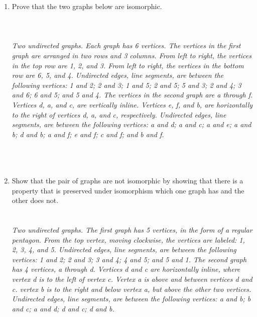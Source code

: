 \documentclass{amsart}
\theoremstyle{definition}
\theoremstyle{Exercise}
\theoremstyle{remark}
\theoremstyle{rule}
\numberwithin{equation}{section}
\begin{document}
\begin{enumerate}[label=(\alph*)]
\item Prove that the two graphs below are isomorphic.\\\\
   \\\\
 {\color{blue}{\bf Figure 4:} \emph{Two undirected graphs. Each graph has 6 vertices. The vertices in the first graph are arranged in two rows and 3 columns. From left to right, the vertices in the top row are 1, 2, and 3. From left to right, the vertices in the bottom row are 6, 5, and 4. Undirected edges, line segments, are between the following vertices: 1 and 2; 2 and 3; 1 and 5; 2 and 5; 5 and 3; 2 and 4; 3 and 6; 6 and 5; and 5 and 4. The vertices in the second graph are a through f. Vertices d, a, and c, are vertically inline. Vertices e, f, and b, are horizontally to the right of vertices d, a, and c, respectively. Undirected edges, line segments, are between the following vertices: a and d; a and c; a and e; a and b; d and b; a and f; e and f; c and f; and b and f.
}
}
\\\\
\\\\
\item Show that the pair of graphs are not isomorphic by showing that there is a property that is preserved under isomorphism which one graph has and the other does not.\\

\\\\
{\color{blue}{\bf Figure 5:} \emph{Two undirected graphs. The first graph has 5 vertices, in the form of a regular pentagon. From the top vertex, moving clockwise, the vertices are labeled: 1, 2, 3, 4, and 5. Undirected edges, line segments, are between the following vertices: 1 and 2; 2 and 3; 3 and 4; 4 and 5; and 5 and 1. The second graph has 4 vertices, a through d. Vertices d and c are horizontally inline, where vertex d is to the left of vertex c. Vertex a is above and between vertices d and c. vertex b is to the right and below vertex a, but above the other two vertices. Undirected edges, line segments, are between the following vertices: a and b; b and c; a and d; d and c; d and b.
}
}
\\
\\
\\\\

\end{enumerate}    
    
\end{document}
